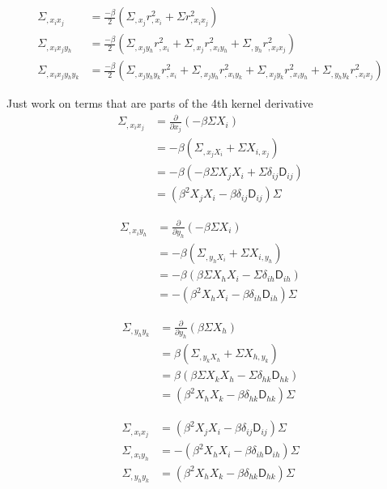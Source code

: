 \begin{align}
\Sigma_{,x_i x_j} &= \frac{-\beta}{2}(\Sigma_{,x_j} r^2_{,x_i} + \Sigma r^2_{,x_i x_j})\\
\Sigma_{,x_i x_j y_h} &= \frac{-\beta}{2}(\Sigma_{,x_j y_h} r^2_{,x_i} + \Sigma_{,x_j}
r^2_{,x_i y_h} + \Sigma_{,y_h} r^2_{,x_i x_j})\\
\Sigma_{,x_i x_j y_h y_k} &= \frac{-\beta}{2} 
(\Sigma_{,x_j y_h y_k} r^2_{,x_i} +
\Sigma_{,x_j y_h} r^2_{,x_i y_k} + 
\Sigma_{,x_j y_k} r^2_{,x_i y_h} + 
\Sigma_{,y_h y_k} r^2_{,x_i x_j} )
\label{eq:4th_derivative_intermediate_expression}
\end{align}

Just work on terms that are parts of the 4th kernel derivative 
\begin{align*}
\Sigma_{,x_i x_j} &= \frac{\partial}{\partial x_j} (-\beta \Sigma X_i)\\
&= -\beta(\Sigma_{,x_j X_i} + \Sigma X_{i, x_j})\\ 
&= -\beta(-\beta \Sigma X_j X_i + \Sigma \delta_{ij} \mathsf{D}_{ij}) \\ 
&= (\beta^2 X_j X_i - \beta \delta_{ij} \mathsf{D}_{ij})\Sigma 
\end{align*}

\begin{align*}
\Sigma_{,x_i y_h} &= \frac{\partial}{\partial y_h} (-\beta \Sigma X_i)\\
&= -\beta(\Sigma_{,y_h X_i} + \Sigma X_{i, y_h})\\ 
&= -\beta(\beta \Sigma X_h X_i - \Sigma \delta_{ih} \mathsf{D}_{ih}) \\ 
&= -(\beta^2 X_h X_i - \beta \delta_{ih} \mathsf{D}_{ih})\Sigma 
\end{align*}

\begin{align*}
\Sigma_{,y_h y_k} &= \frac{\partial}{\partial y_h} (\beta \Sigma X_h)\\
&= \beta(\Sigma_{,y_k X_h} + \Sigma X_{h, y_k})\\ 
&= \beta(\beta \Sigma X_k X_h - \Sigma \delta_{hk} \mathsf{D}_{hk}) \\ 
&= (\beta^2 X_h X_k - \beta \delta_{hk} \mathsf{D}_{hk})\Sigma 
\end{align*}

\begin{align}
\Sigma_{,x_i x_j} &= (\beta^2 X_j X_i - \beta \delta_{ij} \mathsf{D}_{ij})\Sigma\\ 
\Sigma_{,x_i y_h} &= -(\beta^2 X_h X_i - \beta \delta_{ih} \mathsf{D}_{ih})\Sigma\\ 
\Sigma_{,y_h y_k} &= (\beta^2 X_h X_k - \beta \delta_{hk} \mathsf{D}_{hk})\Sigma 
\end{align}

